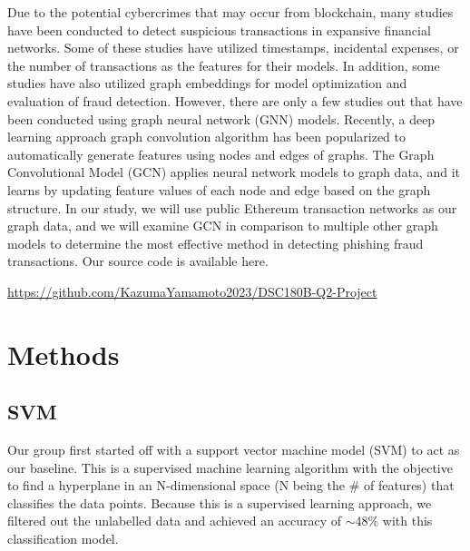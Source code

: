 \documentclass{article}
\begin{document}
	Due to the potential cybercrimes that may occur from blockchain, many studies have been conducted to detect suspicious transactions in expansive financial networks. Some of these studies have utilized timestamps, incidental expenses, or the number of transactions as the features for their models. In addition, some studies have also utilized graph embeddings for model optimization and evaluation of fraud detection. However, there are only a few studies out that have been conducted using graph neural network (GNN) models. Recently, a deep learning approach graph convolution algorithm has been popularized to automatically generate features using nodes and edges of graphs. The Graph Convolutional Model (GCN) applies neural network models to graph data, and it learns by updating feature values of each node and edge based on the graph structure. In our study, we will use public Ethereum transaction networks as our graph data, and we will examine GCN in comparison to multiple other graph models to determine the most effective method in detecting phishing fraud transactions. Our source code is available here.
	
\begin{center}
\url{https://github.com/KazumaYamamoto2023/DSC180B-Q2-Project}
\end{center}


\section{Methods}

\subsection{SVM}
	Our group first started off with a support vector machine model (SVM) to act as our baseline. This is a supervised machine learning algorithm with the objective to find a hyperplane in an N-dimensional space (N being the # of features) that classifies the data points. Because this is a supervised learning approach, we filtered out the unlabelled data and achieved an accuracy of $\sim$$48\%$ with this classification model. 
\end{document}
